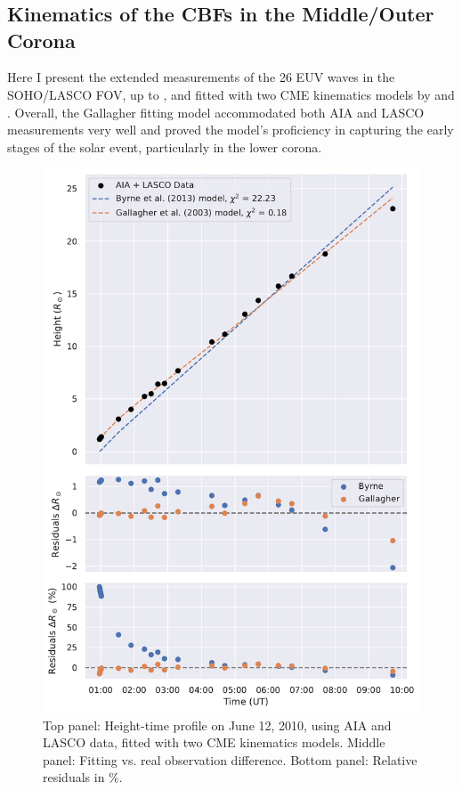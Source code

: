 \chapter{}
\label{appendix}

\section{Kinematics of the CBFs in the Middle/Outer Corona}
\label{ch2_append}
Here I present the extended measurements of the 26 EUV waves in the SOHO/LASCO FOV, up to  \rsun, and fitted with two CME kinematics models by \citet{gallagher_2003} and \citet{byrne_2013}. Overall, the Gallagher fitting model accommodated both AIA and LASCO measurements very well and proved the model's proficiency in capturing the early stages of the solar event, particularly in the lower corona.

\begin{figure}[!htp]
	\centering
	\includegraphics[width=0.8\hsize]{chapter2/figs/appendix/height_profile_residuals_aia_lasco_100612_01.pdf}
	\caption{Top panel: Height-time profile on June 12, 2010, using AIA and LASCO data, fitted with two CME kinematics models. Middle panel: Fitting vs. real observation difference. Bottom panel: Relative residuals in \%.}
\end{figure}

